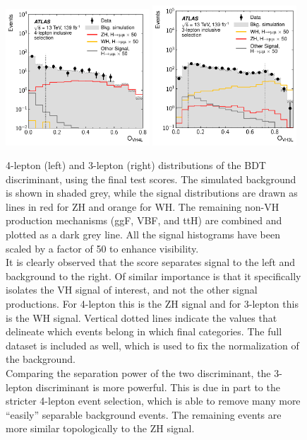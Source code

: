 \begin{figure}[htpb]
  \centering
  \includegraphics[width=0.48\textwidth]{figures/hmm/public/bdt/histo-4lep-bdtScore.pdf}
  \includegraphics[width=0.48\textwidth]{figures/hmm/public/bdt/histo-3lep-bdtScore.pdf}
  \caption{4-lepton (left) and 3-lepton (right) distributions of the BDT discriminant, using the final test scores. The simulated background is shown in shaded grey, while the signal distributions are drawn as lines in red for ZH and orange for WH. The remaining non-VH production mechanisms (ggF, VBF, and ttH) are combined and plotted as a dark grey line. All the signal histograms have been scaled by a factor of 50 to enhance visibility.\\
  It is clearly observed that the score separates signal to the left and background to the right. Of similar importance is that it specifically isolates the VH signal of interest, and not the other signal productions. For 4-lepton this is the ZH signal and for 3-lepton this is the WH signal. Vertical dotted lines indicate the values that delineate which events belong in which final categories. The full dataset is included as well, which is used to fix the normalization of the background. \\
  Comparing the separation power of the two discriminant, the 3-lepton discriminant is more powerful. This is due in part to the stricter 4-lepton event selection, which is able to remove many more ``easily'' separable background events. The remaining events are more similar topologically to the ZH signal.}
    \label{fig:hmmBdtScore}
\end{figure}

